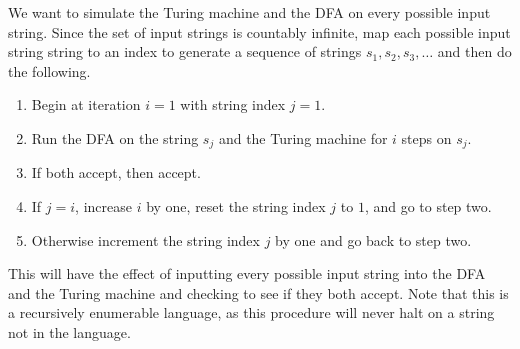 \documentclass[12pt]{article}
\begin{document}
We want to simulate the Turing machine and the DFA on every possible input string. Since the set of input strings is
countably infinite, map each possible input string string to an index to generate a sequence of strings \(s_1, s_2, s_3,\ldots\) and
then do the following.
\begin{enumerate}
        \item Begin at iteration \(i=1\) with string index \(j=1\).
        \item Run the DFA on the string \(s_j\) and the Turing machine for \(i\) steps on \(s_j\).
        \item If both accept, then accept.
        \item If \(j=i\), increase \(i\) by one, reset the string index \(j\) to \(1\), and go to step two.
        \item Otherwise increment the string index \(j\) by one and go back to step two.
\end{enumerate}
This will have the effect of inputting every possible input string into the DFA and the Turing machine and checking to see if they both accept.
Note that this is a recursively enumerable language, as this procedure will never halt on a string not in the language.
\end{document}
